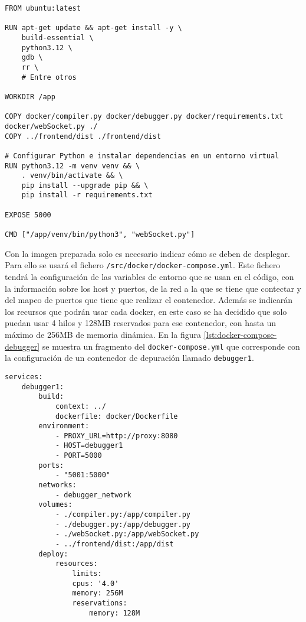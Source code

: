 \begin{lstlisting}[caption={Dockerfile para el contenedor de depuración}, label={lst:dockerfile-debugger}]
FROM ubuntu:latest

RUN apt-get update && apt-get install -y \
    build-essential \
    python3.12 \
    gdb \
    rr \
    # Entre otros

WORKDIR /app

COPY docker/compiler.py docker/debugger.py docker/requirements.txt docker/webSocket.py ./
COPY ../frontend/dist ./frontend/dist

# Configurar Python e instalar dependencias en un entorno virtual
RUN python3.12 -m venv venv && \
    . venv/bin/activate && \
    pip install --upgrade pip && \
    pip install -r requirements.txt

EXPOSE 5000

CMD ["/app/venv/bin/python3", "webSocket.py"]
\end{lstlisting}


Con la imagen preparada solo es necesario indicar cómo se deben de desplegar. Para ello se usará el fichero \texttt{/src/docker/docker-compose.yml}. Este fichero tendrá la configuración de las \gls{variables de entorno} que se usan en el código, con la información sobre los host y puertos, de la red a la que se tiene que contectar y del mapeo de puertos que tiene que realizar el \gls{contenedor}. Además se indicarán los recursos que podrán usar cada docker, en este caso se ha decidido que solo puedan usar 4 \glspl{hilo} y 128MB reservados para ese \gls{contenedor}, con hasta un máximo de 256MB de memoria dinámica. En la figura \ref{lst:docker-compose-debugger} se muestra un fragmento del \texttt{docker-compose.yml} que corresponde con la configuración de un \gls{contenedor} de depuración llamado \texttt{debugger1}. 

\begin{lstlisting}[caption={Docker-compose.yml para un contenedor de depuración}, label={lst:docker-compose-debugger}]
services:
    debugger1:
        build:
            context: ../ 
            dockerfile: docker/Dockerfile
        environment:
            - PROXY_URL=http://proxy:8080 
            - HOST=debugger1
            - PORT=5000
        ports:
            - "5001:5000"
        networks:
            - debugger_network
        volumes:
            - ./compiler.py:/app/compiler.py
            - ./debugger.py:/app/debugger.py
            - ./webSocket.py:/app/webSocket.py
            - ../frontend/dist:/app/dist  
        deploy:
            resources:
                limits:
                cpus: '4.0'
                memory: 256M
                reservations:
                    memory: 128M
\end{lstlisting}

